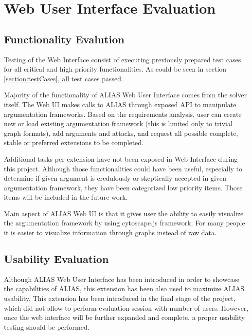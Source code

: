 \section{Web User Interface Evaluation}


\subsection{Functionality Evalution}
Testing of the Web Interface consist of executing previously prepared test cases for all critical and high priority functionalities. As could be seen in section \ref{section:testCases}, all test cases passed.

Majority of the functionality of ALIAS Web User Interface comes from the solver itself. The Web UI makes calls to ALIAS through exposed API to manipulate argumentation frameworks. Based on the requirements analysis, user can create new or load existing argumentation framework (this is limited only to trivial graph formats), add arguments and attacks, and request all possible complete, stable or preferred extensions to be completed. 

Additional tasks per extension have not been exposed in Web Interface during this project. Although those functionalities could have been useful, especially to determine if given argument is credulously or skeptically accepted in given argumentation framework, they have been categorized low priority items. Those items will be included in the future work.

Main aspect of ALIAS Web UI is that it gives user the ability to easily visualize the argumentation framework by using cytoscape.js framework. For many people it is easier to visualize information through graphs instead of raw data. 

\subsection{Usability Evaluation}
Although ALIAS Web User Interface has been introduced in order to showcase the capabilities of ALIAS, this extension has been also used to maximize ALIAS usability. This extension has been introduced in the final stage of the project, which did not allow to perform evaluation session with number of users. However, once the web interface will be further expanded and complete, a proper usability testing should be performed.